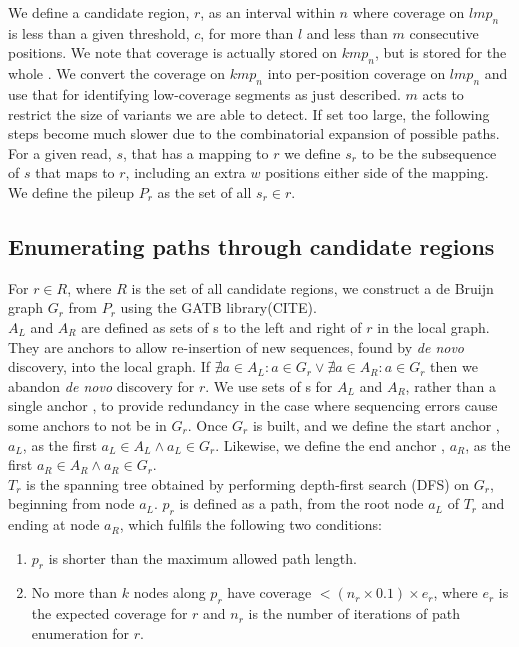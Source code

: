 We define a candidate region, $r$, as an interval within $n$ where coverage on $lmp_n$ is less than a given threshold, $c$, for more than $l$ and less than $m$ consecutive positions. We note that coverage is actually stored on $kmp_n$, but is stored for the whole \kmer{}. We convert the coverage on $kmp_n$ into per-position coverage on $lmp_n$ and use that for identifying low-coverage segments as just described. $m$ acts to restrict the size of variants we are able to detect. If set too large, the following steps become much slower due to the combinatorial expansion of possible paths. \\
For a given read, $s$, that has a mapping to $r$ we define $s_r$ to be the subsequence of $s$ that maps to $r$, including an extra $w$ positions either side of the mapping. We define the pileup $P_r$ as the set of all $s_r \in r$.

\subsection{Enumerating paths through candidate regions}
\label{sec:path-enum}

For $r \in R$, where $R$ is the set of all candidate regions, we construct a de Bruijn graph $G_r$ from $P_r$ using the GATB library(CITE). \\
$A_L$ and $A_R$ are defined as sets of \kmer{}s to the left and right of $r$ in the local graph. They are anchors to allow re-insertion of new sequences, found by \textit{de novo} discovery, into the local graph. If  $\nexists a \in A_L : a \in G_r \lor \nexists a \in A_R : a \in G_r$ then we abandon \textit{de novo} discovery for $r$. We use sets of \kmer{}s for $A_L$ and $A_R$, rather than a single anchor \kmer{}, to provide redundancy in the case where sequencing errors cause some anchors to not be in $G_r$. Once $G_r$ is built, and we define the start anchor \kmer{}, $a_L$, as the first $a_L \in A_L \land a_L \in G_r$. Likewise, we define the end anchor \kmer{}, $a_R$, as the first $a_R \in A_R \land a_R \in G_r$.\\

$T_r$ is the spanning tree obtained by performing depth-first search (DFS) on $G_r$, beginning from node $a_L$. $p_r$ is defined as a path, from the root node $a_L$ of $T_r$ and ending at node $a_R$, which fulfils the following two conditions:

\begin{enumerate}
  \item $p_r$ is shorter than the maximum allowed path length.
  \item No more than $k$ nodes along $p_r$ have coverage $< (n_r \times 0.1) \times e_r$, where $e_r$ is the expected \kmer{} coverage for $r$ and $n_r$ is the number of iterations of path enumeration for $r$.
\end{enumerate}

